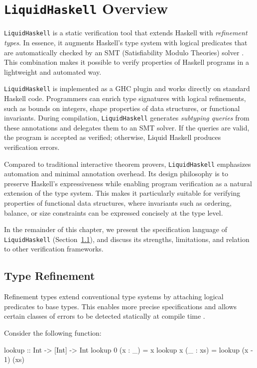 \chapter { \texttt{LiquidHaskell} Overview }
\texttt{LiquidHaskell} is a static verification tool that extends Haskell with
\emph{refinement types}. In essence, it augments Haskell’s type system with
logical predicates that are automatically checked by an SMT (Satisfiability
Modulo Theories) solver \cite{vazou2014}. This combination makes it possible
to verify properties of Haskell programs in a lightweight and automated way.

\texttt{LiquidHaskell} is implemented as a GHC plugin and works directly on standard
Haskell code. Programmers can enrich type signatures with logical refinements,
such as bounds on integers, shape properties of data structures, or functional
invariants. During compilation, \texttt{LiquidHaskell} generates \emph{subtyping
	queries} from these annotations and delegates them to an SMT solver. If the
queries are valid, the program is accepted as verified; otherwise, Liquid
Haskell produces verification errors.

Compared to traditional interactive theorem provers, \texttt{LiquidHaskell} emphasizes
automation and minimal annotation overhead. Its design philosophy is to
preserve Haskell’s expressiveness while enabling program verification as a
natural extension of the type system. This makes it particularly suitable for
verifying properties of functional data structures, where invariants such as
ordering, balance, or size constraints can be expressed concisely at the type
level.

In the remainder of this chapter, we present the specification language of
\texttt{LiquidHaskell} (Section~\ref{sec:specification}), and discuss its strengths, limitations,
and relation to other verification frameworks.


\section{Type Refinement}
\label{sec:specification}

Refinement types extend conventional type systems by attaching logical predicates
to base types. This enables more precise specifications and allows certain classes
of errors to be detected statically at compile time \cite{vazou2014}.

Consider the following function:

\begin{code}
	lookup :: Int -> [Int] -> Int
	lookup 0 (x : _) = x
	lookup x (_ : xs) = lookup (x - 1) (xs)
\end{code}

